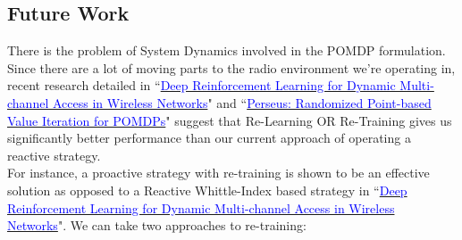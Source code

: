 \documentclass[12pt, draftcls, onecolumn]{IEEEtran}
\begin{document}
\subsection{Future Work}
There is the problem of System Dynamics involved in the POMDP formulation. Since there are a lot of moving parts to the radio environment we're operating in, recent research detailed in ``\href{https://ieeexplore.ieee.org/document/8303773}{\textcolor{blue}{Deep Reinforcement Learning for Dynamic Multi-channel Access in Wireless Networks}}" and ``\href{https://arxiv.org/pdf/1109.2145.pdf}{\textcolor{blue}{Perseus: Randomized Point-based Value Iteration for POMDPs}}" suggest that Re-Learning OR Re-Training gives us significantly better performance than our current approach of operating a reactive strategy.
\\For instance, a proactive strategy with re-training is shown to be an effective solution as opposed to a Reactive Whittle-Index based strategy in ``\href{https://ieeexplore.ieee.org/document/8303773}{\textcolor{blue}{Deep Reinforcement Learning for Dynamic Multi-channel Access in Wireless Networks}}". We can take two approaches to re-training:
\end{document}
